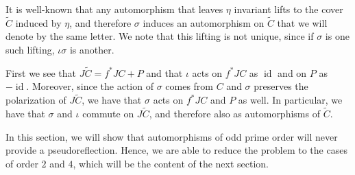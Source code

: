 \documentclass[preprint,12pt]{amsart}
\def\tC{\ensuremath{\tilde{C}}}
\DeclareMathOperator{\id}{id}
\theoremstyle{plain}
\theoremstyle{definition}
\begin{document}
It is well-known that any automorphism that leaves $\eta$ invariant lifts to the cover $\tC$ induced by $\eta $, and therefore $\sigma$ induces an automorphism on $\tC$ that we will denote by the same letter.
We note that this lifting is not unique, since if $\sigma$ is one such lifting, $\iota\sigma$ is another.

First we see that $J\tC=f^*JC+P$ and that $\iota$ acts on $f^*JC$ as $\id$ and on $P$ as $-\id$.
Moreover, since the action of $\sigma$ comes from $C$ and $\sigma$ preserves the polarization of $J\tC$, we have that $\sigma$ acts on $f^*JC$ and $P$ as well.
In particular, we have that $\sigma$ and $\iota$ commute on $J\tC$, and therefore also as automorphisms of $\tC$.

In this section, we will show that automorphisms of odd prime order will never provide a pseudoreflection.
Hence, we are able to reduce the problem to the cases of order $2$ and $4$, which will be the content of the next section.
\end{document}
